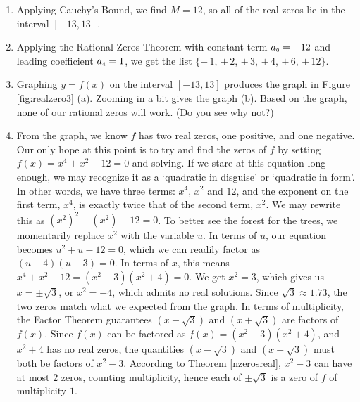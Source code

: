 {
\begin{enumerate}

\item  Applying Cauchy's Bound, we find $M = 12$, so all of the real zeros lie in the interval $[-13,13]$.

\item  Applying the Rational Zeros Theorem with constant term $a_{\mbox{\tiny$0$}} = -12$ and leading coefficient $a_{\mbox{\tiny$4$}} = 1$, we get the list $\{\pm \, 1$, $\pm \, 2$, $\pm \, 3$, $\pm \, 4$, $\pm \, 6$, $\pm \, 12\}$.

\item  Graphing $y=f(x)$ on the interval $[-13,13]$ produces the graph in Figure \ref{fig:realzero3} (a). Zooming in a bit gives the graph (b).  Based on the graph, none of our rational zeros will work. (Do you see why not?)


\item  From the graph, we know $f$ has two real zeros, one positive, and one negative.  Our only hope at this point is to try and find the zeros of $f$ by setting $f(x)=x^4+x^2-12=0$ and solving.  If we stare at this equation long enough, we may recognize it as a `quadratic in disguise' or `quadratic in form'.   In other words, we have three terms: $x^4$, $x^2$ and $12$, and the exponent on the first term, $x^4$, is exactly twice that of the second term, $x^2$.  We may rewrite this as $\left(x^2\right)^2 + \left(x^2\right) - 12 = 0$.  To better see the forest for the trees, we momentarily replace $x^2$ with the variable $u$.  In terms of $u$, our equation becomes $u^2 + u - 12 = 0$, which we can readily factor as $(u+4)(u-3) = 0$.  In terms of $x$, this means $x^4+x^2-12= \left(x^2-3\right) \left(x^2 + 4 \right)=0$. We get $x^2 = 3$, which gives us $x = \pm \sqrt{3}$, or $x^2=-4$, which admits no real solutions.  Since $\sqrt{3} \approx 1.73$, the two zeros match what we expected from the graph.  In terms of multiplicity, the Factor Theorem guarantees $\left(x - \sqrt{3}\right)$ and $\left(x + \sqrt{3}\right)$ are factors of $f(x)$.  Since $f(x)$ can be factored as $f(x) = \left(x^2-3\right) \left(x^2 + 4 \right)$, and $x^2 + 4$ has no real zeros, the quantities $\left(x - \sqrt{3}\right)$ and $\left(x + \sqrt{3}\right)$ must both be factors of $x^2-3$.  According to Theorem \ref{nzerosreal}, $x^2-3$ can have at most $2$ zeros, counting multiplicity, hence each of $\pm \sqrt{3}$ is a zero of $f$ of multiplicity $1$. 

\end{enumerate}
}

